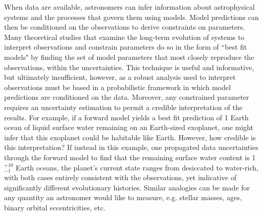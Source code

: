 When data are available, astronomers can infer information about astrophysical systems and the processes that govern them using models. Model predictions can then be conditioned on the observations to derive constraints on parameters. Many theoretical studies that examine the long-term evolution of systems to interpret observations and constrain parameters do so in the form of ``best fit models" by finding the set of model parameters that most closely reproduce the observations, within the uncertainties.  This technique is useful and informative, but ultimately insufficient, however, as a robust analysis used to interpret observations must be based in a probabilistic framework in which model predictions are conditioned on the data. Moreover, any constrained parameter requires an uncertainty estimation to permit a credible interpretation of the results.  For example, if a forward model yields a best fit prediction of 1 Earth ocean of liquid surface water remaining on an Earth-sized exoplanet, one might infer that this exoplanet could be habitable like Earth. However, how credible is this interpretation?  If instead in this example, one propagated data uncertainties through the forward model to find that the remaining surface water content is 1$^{+10}_{-1}$ Earth oceans, the planet's current state ranges from desiccated to water-rich, with both cases entirely consistent with the observations, yet indicative of significantly different evolutionary histories. Similar analogies can be made for any quantity an astronomer would like to measure, e.g. stellar masses, ages, binary orbital eccentricities, etc.

